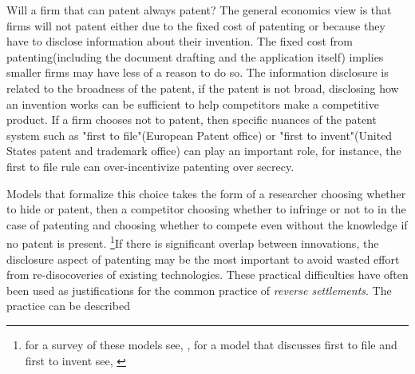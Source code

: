 \documentclass[12pt]{article}
\numberwithin{equation}{section}
\begin{document}
Will a firm that can patent always patent? The general economics view is that firms will not patent either due to the fixed cost of patenting or because they have to disclose information about their invention. The fixed cost from patenting(including the document drafting and the application itself) implies smaller firms may have less of a reason to do so. The information disclosure is related to the broadness of the patent, if the patent is not broad, disclosing how an invention works can be sufficient to help competitors make a competitive product. If a firm chooses not to patent, then specific nuances of the patent system such as "first to file"(European Patent office) or "first to invent"(United States patent and trademark office) can play an important role, for instance, the first to file rule can over-incentivize patenting over secrecy.


Models that formalize this choice takes the form of a researcher choosing whether to hide or patent, then a competitor choosing whether to infringe or not to in the case of patenting and choosing whether to compete even without the knowledge if no patent is present. \footnote{for a survey of these models see, \cite{Hall2014}, for a model that discusses first to file and first to invent see, \cite{Scotchmer1990} }If there is significant overlap between innovations, the disclosure aspect of patenting may be the most important to avoid wasted effort from re-disocoveries of existing technologies\cite{Kultti2007}. These practical difficulties have often been used as justifications for the common practice of \textit{reverse settlements}. The practice can be described

\end{document}
